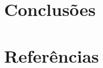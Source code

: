 \documentclass[10pt]{article}
\begin{document}
\section{Conclusões}\label{sec:an-da-info-fin-da-org}

\vspace{1cm}

\section{Referências}\label{sec:sup-inf-utl}






\pagebreak
\end{document}
